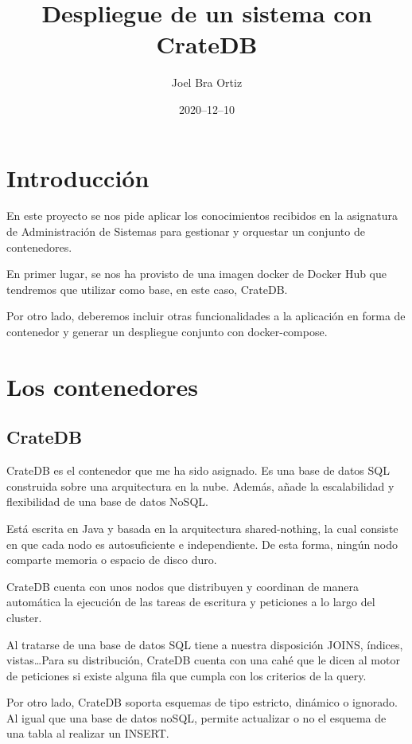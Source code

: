 \documentclass[12pt]{article}
\title{Despliegue de un sistema con CrateDB}
\author{Joel Bra Ortiz}
\date{2020–12–10}
\begin{document}
\maketitle

\section{Introducción}

En este proyecto se nos pide aplicar los conocimientos recibidos en la
asignatura de Administración de Sistemas para gestionar y orquestar un
conjunto de contenedores.

En primer lugar, se nos ha provisto de una imagen docker de Docker Hub que
tendremos que utilizar como base, en este caso, CrateDB\@.

Por otro lado, deberemos incluir otras funcionalidades a la aplicación en
forma de contenedor y generar un despliegue conjunto con docker-compose.

\section{Los contenedores}

\subsection[1]{CrateDB}
CrateDB es el contenedor que me ha sido asignado. Es una base de datos SQL
construida sobre una arquitectura en la nube. Además, añade la escalabilidad
y flexibilidad de una base de datos NoSQL\@.

Está escrita en Java y basada en la arquitectura shared-nothing, la cual
consiste en que cada nodo es autosuficiente e independiente. De esta forma,
ningún nodo comparte memoria o espacio de disco duro.

CrateDB cuenta con unos nodos que distribuyen y coordinan de manera
automática la ejecución de las tareas de escritura y peticiones a lo largo
del cluster.

Al tratarse de una base de datos SQL tiene a nuestra disposición JOINS, índices,
vistas\ldots Para su distribución, CrateDB cuenta con una cahé que le dicen al
motor de peticiones si existe alguna fila que cumpla con los criterios de la query.

Por otro lado, CrateDB soporta esquemas de tipo estricto, dinámico o ignorado. Al
igual que una base de datos noSQL, permite actualizar o no el esquema de una tabla
al realizar un INSERT.\@
\end{document}
